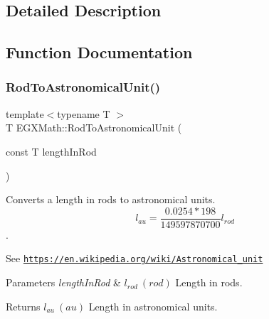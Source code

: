 \subsection{Detailed Description}


\subsection{Function Documentation}
\mbox{\label{group___e_g_x_math-_conversions-_length_conversions-_surveyors-_rod-_astronomical_ga320c74af81e2f062967e5c767d089a87}} 
\subsubsection{\texorpdfstring{Rod\+To\+Astronomical\+Unit()}{RodToAstronomicalUnit()}}
{\footnotesize\ttfamily template$<$typename T $>$ \\
T E\+G\+X\+Math\+::\+Rod\+To\+Astronomical\+Unit (\begin{DoxyParamCaption}\item[{const T}]{length\+In\+Rod }\end{DoxyParamCaption})}



Converts a length in rods to astronomical units. \[ l_{au}=\frac{0.0254 * 198}{149597870700} l_{rod} \]. 

See \href{https://en.wikipedia.org/wiki/Astronomical_unit}{\tt https\+://en.\+wikipedia.\+org/wiki/\+Astronomical\+\_\+unit} 
\begin{DoxyParams}{Parameters}
{\em length\+In\+Rod} & $ l_{rod}\ (rod)$ Length in rods. \\
\hline
\end{DoxyParams}
\begin{DoxyReturn}{Returns}
$ l_{au}\ (au)$ Length in astronomical units. 
\end{DoxyReturn}
\mbox{\label{group___e_g_x_math-_conversions-_length_conversions-_surveyors-_rod-_astronomical_gae5824aa8a60a3fe280de82b165cc0ed7}} 
